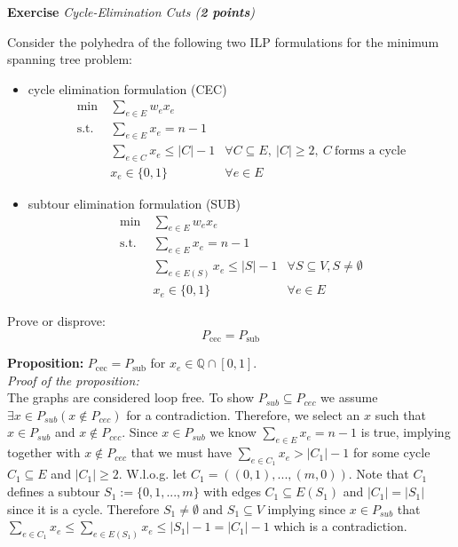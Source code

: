 \documentclass[a4paper,10pt]{article}
\newcounter{exc}
\newenvironment{exercise}[1]%
{\refstepcounter{exc}\textbf{Exercise \arabic{exc}} \emph{#1}\\}
{

\hrulefill\medskip}%
\begin{document}
\begin{exercise}{Cycle-Elimination Cuts (\textbf{2 points})}\label{ex:cec}

Consider the polyhedra of the following two ILP formulations for the minimum spanning tree problem:

\begin{itemize}
\item cycle elimination formulation (CEC)
\begin{align}
	\min\ & \sum_{e \in E} w_e x_e \\
	\text{s.t.} & \sum_{e \in E} x_e = n-1 \\
		& \sum_{e \in C} x_e \leq |C|-1 & \forall C \subseteq E,\ |C|\ge 2,\ C~\mbox{forms a cycle} \\
		& x_e \in \{0, 1\} & \forall e \in E
\end{align}

\item subtour elimination formulation (SUB)
\begin{align}
	\min\ & \sum_{e \in E} w_e x_e \\
	\text{s.t.} & \sum_{e \in E} x_e = n-1 \\
		& \sum_{e \in E(S)} x_e \leq |S|-1 & \forall S \subseteq V, S \neq \emptyset \\
		& x_e \in \{0, 1\} & \forall e \in E
\end{align}
\end{itemize}
Prove or disprove:
\[ P_\mathrm{cec} = P_\mathrm{sub} \]

\textbf{Proposition:}
$P_\mathrm{cec} = P_\mathrm{sub}$ for $x_e \in \mathbb{Q}\cap[0,1]$.\\
%
\emph{Proof of the proposition:}\\
%
The graphs are considered loop free.
To show $P_{sub}\subseteq P_{cec}$ we assume $\exists x\in P_{sub}(x\not\in P_{cec})$ for a contradiction.
Therefore, we select an $x$ such that $x\in P_{sub}$ and $x\not\in P_{cec}$. Since $x\in P_{sub}$ we know $\sum\limits_{e \in E} x_e = n-1$ is true, implying together with $x\not\in P_{cec}$ that we must have $\sum\limits_{e\in C_1}x_e> |C_1|-1$ for some cycle $C_1\subseteq E$ and $|C_1|\geq 2$. W.l.o.g. let $C_1 =((0,1), ..., (m,0))$. Note that $C_1$ defines a subtour $S_1:=\{ 0,1,...,m\}$ with edges $C_1\subseteq E(S_1)$ and $|C_1|=|S_1|$ since it is a cycle. Therefore $S_1\neq \emptyset$ and $S_1\subseteq V$ implying since $x\in P_{sub}$ that $\sum\limits_{e\in C_1} x_e \leq \sum\limits_{e\in E(S_1)} x_e \leq |S_1|-1 = |C_1|-1$ which is a contradiction.


\end{exercise}
\end{document}
